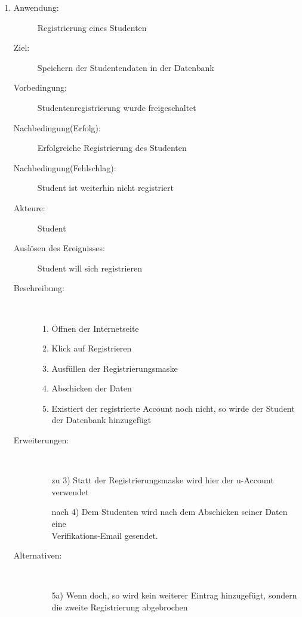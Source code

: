 \documentclass[parskip=full]{scrartcl}
\newcommand{\swtLabel}[1]{\textbf{\textbackslash #1\arabic*0\textbackslash}}
\begin{document}
\begin{enumerate}[label=\swtLabel{S}]
	\item
    \begin{description}
  	\item[Anwendung:] Registrierung eines Studenten
  	\item[Ziel:] Speichern der Studentendaten in der Datenbank
  	\item[Vorbedingung:] Studentenregistrierung wurde freigeschaltet
  	\item[Nachbedingung(Erfolg):] Erfolgreiche Registrierung des Studenten
  	\item[Nachbedingung(Fehlschlag):] Student ist weiterhin nicht registriert
  	\item[Akteure:] Student
  	\item[Auslösen des Ereignisses:] Student will sich registrieren
  	\item[Beschreibung:]~
  	\begin{enumerate}
  	  \item Öffnen der Internetseite
      \item Klick auf Registrieren
      \item Ausfüllen der Registrierungsmaske
      \item Abschicken der Daten
      \item Existiert der registrierte Account noch nicht, so wirde der Student
      der Datenbank hinzugefügt
  	\end{enumerate}
  	\item[Erweiterungen:]~
  	\begin{enumerate}
  	  \item[zu 3)] Statt der Registrierungsmaske wird hier der u-Account
  	  verwendet
  	  \item[nach 4)] Dem Studenten wird nach dem Abschicken seiner Daten eine \\
  	  Verifikations-Email gesendet.
  	 \end{enumerate} 
  	\item[Alternativen:]~
  	\begin{enumerate}
  	  \item[5a)] Wenn doch, so wird kein weiterer Eintrag hinzugefügt, sondern
  	  die zweite Registrierung abgebrochen
  	\end{enumerate} 
  \end{description}
%   
  

\end{enumerate}
\end{document}
